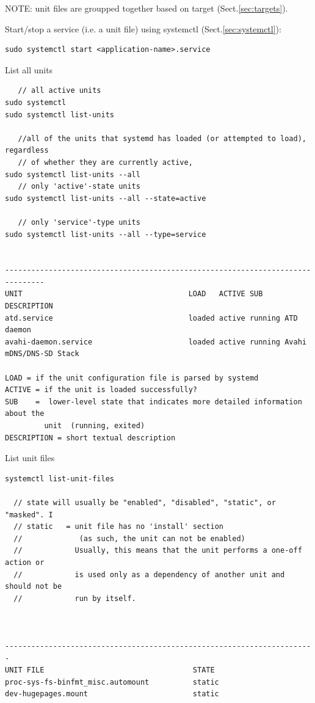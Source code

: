NOTE: unit files are groupped together based on target (Sect.\ref{sec:targets}).

Start/stop a service (i.e. a unit file) using systemctl
(Sect.\ref{sec:systemctl}):
\begin{verbatim}
sudo systemctl start <application-name>.service
\end{verbatim}

List all units
\begin{verbatim}
   // all active units
sudo systemctl
sudo systemctl list-units

   //all of the units that systemd has loaded (or attempted to load), regardless
   // of whether they are currently active, 
sudo systemctl list-units --all
   // only 'active'-state units
sudo systemctl list-units --all --state=active

   // only 'service'-type units
sudo systemctl list-units --all --type=service


-------------------------------------------------------------------------------
UNIT                                      LOAD   ACTIVE SUB     DESCRIPTION
atd.service                               loaded active running ATD daemon
avahi-daemon.service                      loaded active running Avahi mDNS/DNS-SD Stack

LOAD = if the unit configuration file is parsed by systemd
ACTIVE = if the unit is loaded successfully?
SUB    =  lower-level state that indicates more detailed information about the
         unit  (running, exited)
DESCRIPTION = short textual description
\end{verbatim}



List unit files
\begin{verbatim}
systemctl list-unit-files

  // state will usually be "enabled", "disabled", "static", or "masked". I
  // static   = unit file has no 'install' section
  //             (as such, the unit can not be enabled)
  //            Usually, this means that the unit performs a one-off action or
  //            is used only as a dependency of another unit and should not be
  //            run by itself.
  
  
  
-----------------------------------------------------------------------
UNIT FILE                                  STATE   
proc-sys-fs-binfmt_misc.automount          static  
dev-hugepages.mount                        static  
\end{verbatim}

